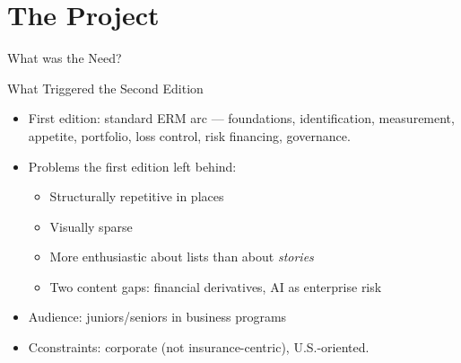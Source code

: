 \documentclass[11pt, aspectratio=169]{beamer}
\begin{document}
\section{The Project}
\begin{frame}{What was the Need?}
\begin{frame}{What Triggered the Second Edition}
\begin{itemize}
  \item First edition: standard ERM arc --- foundations, identification, measurement,
        appetite, portfolio, loss control, risk financing, governance.
  \item Problems the first edition left behind:
        \begin{itemize}
          \item Structurally repetitive in places
          \item Visually sparse
          \item More enthusiastic about lists than about \emph{stories}
          \item Two content gaps: financial derivatives, AI as enterprise risk
        \end{itemize}
  \item Audience: juniors/seniors in business programs  
  \item Cconstraints: corporate (not insurance-centric),
        U.S.-oriented. 
\end{itemize}
\end{frame}


\end{frame}
\end{document}
